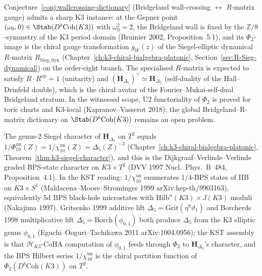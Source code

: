 \begin{remark}
\label{rem:dcy-kst-bridgeland-rmatrix}
Conjecture~\ref{conj:wallcrossing-dictionary} (Bridgeland
wall-crossing $\leftrightarrow$ $R$-matrix gauge) admits a sharp K3
instance: at the Gepner point
$(\omega_0, 0)\in\Stab(D^b\mathrm{Coh}(K3))$ with
$\omega_0^2 = 2$, the Bridgeland wall is fixed by the
$\mathbb{Z}/8$-symmetry of the K3 period domain (Bruinier 2002,
Proposition~5.1), and its $\Phi_2$-image is the chiral gauge
transformation
$g_W(z)$ of the Siegel-elliptic dynamical
$R$-matrix $R_{\mathrm{Sieg,dyn}}$
(Chapter~\ref{ch:k3-chiral-bialgebra-platonic},
Section~\ref{sec:R-Sieg-dynamical}) on the order-eight branch. The
specialised \(R\)-matrix is expected to satisfy
$R\cdot R^{\mathrm{op}} = 1$ (unitarity) and
$(\mathbf{H}_{\Delta_5})^\vee \simeq \mathbf{H}_{\Delta_5}$ (self-duality
of the Hall--Drinfeld double), which is the chiral avatar of the
Fourier--Mukai-self-dual Bridgeland stratum. In the witnessed scope, U2
functoriality of $\Phi_2$ is proved for toric charts and K3-local
(Kapranov--Vasserot 2018); the global Bridgeland--R-matrix dictionary
on $\Stab(D^b\mathrm{Coh}(K3))$ remains an open problem.
\end{remark}

\begin{remark}
\label{rem:dcy-kst-chi10}
The genus-2 Siegel character of $\mathbf{H}_{\Delta_5}$ on $T^2$
equals
$1/\Phi_{10}^{\mathrm{un}}(Z) =
1/\chi_{10}^{\mathrm{un}}(Z)=\Delta_5(Z)^{-2}$
(Chapter~\ref{ch:k3-chiral-bialgebra-platonic},
Theorem~\ref{thm:k3-siegel-character}), and this is the
Dijkgraaf--Verlinde--Verlinde graded BPS-state character on
$K3\times T^2$ (DVV 1997 \textup{Nucl.~Phys.~B}~484, Proposition~4.1).
In the KST reading: $1/\chi_{10}^{\mathrm{un}}$ enumerates 1/4-BPS states of IIB on
$K3\times S^1$ (Maldacena--Moore--Strominger 1999
\textup{arXiv:hep-th/9903163}), equivalently 5d BPS black-hole
microstates with $\mathrm{Hilb}^n(K3)\times J(K3)$ moduli (Nakajima
1997). Gritsenko 1999 additive lift
$\Delta_5 = \mathrm{Grit}(\eta^9\vartheta_1)$ and Borcherds 1998
multiplicative lift
$\Delta_5 = \mathrm{Borch}(\phi_{0,1})$ both produce $\Delta_5$ from
the K3 elliptic genus $\phi_{0,1}$ (Eguchi--Ooguri--Tachikawa 2011
\textup{arXiv:1004.0956}); the KST assembly is that
$\mathcal{H}_{K3}$-CoHA computation of $\phi_{0,1}$ feeds through
$\Phi_2$ to $\mathbf{H}_{\Delta_5}$'s character, and the BPS Hilbert
series $1/\chi_{10}^{\mathrm{un}}$ is the chiral partition function of
$\Phi_2(D^b\mathrm{Coh}(K3))$ on $T^2$.
\end{remark}


